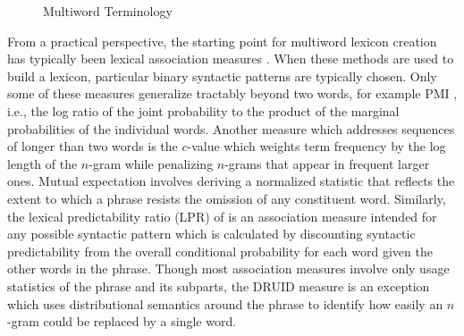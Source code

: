 \documentclass[11pt,letterpaper]{article}
\begin{document}
\begin{figure}[!t]
\caption{Multiword Terminology}
\label{fig:terminology}
\end{figure}



From a practical perspective, the starting point for multiword lexicon creation has typically been lexical association measures \cite{Church90,Dunning93,Schone01,Evert04,Pecina10,DeAraujo11,Kulkarni11,Ramisch14}. When these methods are used to build a lexicon, particular binary syntactic patterns are typically chosen. Only some of these measures generalize tractably beyond two words, for example PMI \cite{Church90}, i.e., the log ratio of the joint probability to the product of the marginal probabilities of the individual words. Another measure which addresses sequences of longer than two words is the $c$-value \cite{Frantzi00} which weights term frequency by the log length of the $n$-gram while penalizing $n$-grams that appear in frequent larger ones. Mutual expectation \cite{Dias99} involves deriving a normalized statistic that reflects the extent to which a phrase resists the omission of any constituent word. Similarly, the lexical predictability ratio (LPR) of  is an association measure intended for any possible syntactic pattern which is calculated by discounting syntactic predictability from the overall conditional probability for each word given the other words in the phrase. Though most association measures involve only usage statistics of the phrase and its subparts, the DRUID measure \cite{Riedl15} is an exception which uses distributional semantics around the phrase to identify how easily an $n$-gram could be replaced by a single word.
\end{document}
